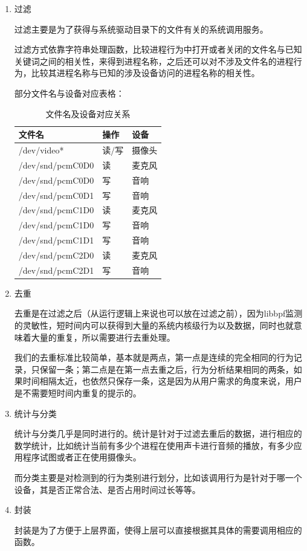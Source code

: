 \documentclass[12pt,a4paper]{ctexart}
\begin{document}
\begin{enumerate}
  \item 过滤

过滤主要是为了获得与系统驱动目录下的文件有关的系统调用服务。


过滤方式依靠字符串处理函数，比较进程行为中打开或者关闭的文件名与已知关键词之间的相关性，来得到进程名称，之后还可以对不涉及文件名的进程行为，比较其进程名称与已知的涉及设备访问的进程名称的相关性。

部分文件名与设备对应表格：


\begin{table}[htb]
\centering
\begin{tabular}{|p{4cm}|p{2cm}|p{3cm}|}
  \hline
  \rowcolor{blue!50} 文件名&操作&设备\\
  \hline
   /dev/video*&读/写&摄像头\\
  \hline
  /dev/snd/pcmC0D0&读&麦克风\\
  \hline
  /dev/snd/pcmC0D0&写&音响\\
  \hline
  /dev/snd/pcmC0D1&写&音响\\
  \hline
  /dev/snd/pcmC1D0&读&麦克风\\
  \hline
  /dev/snd/pcmC1D0&写&音响\\
  \hline
  /dev/snd/pcmC1D1&写&音响\\
  \hline
  /dev/snd/pcmC2D0&读&麦克风\\
  \hline
  /dev/snd/pcmC2D1&写&音响\\
  \hline
\end{tabular}
\caption{文件名及设备对应关系}
\end{table}
  \item 去重


去重是在过滤之后（从运行逻辑上来说也可以放在过滤之前），因为libbpf监测的灵敏性，短时间内可以获得到大量的系统内核级行为以及数据，同时也就意味着大量的重复，所以需要进行去重处理。\par
我们的去重标准比较简单，基本就是两点，第一点是连续的完全相同的行为记录，只保留一条；第二点是在第一点去重之后，行为分析结果相同的两条，如果时间相隔太近，也依然只保存一条，这是因为从用户需求的角度来说，用户是不需要短时间内重复的提示的。

  \item 统计与分类

统计与分类几乎是同时进行的。统计是针对于过滤去重后的数据，进行相应的数学统计，比如统计当前有多少个进程在使用声卡进行音频的播放，有多少应用程序试图或者正在使用摄像头。


而分类主要是对检测到的行为类别进行划分，比如该调用行为是针对于哪一个设备，其是否正常合法、是否占用时间过长等等。

  \item 封装

封装是为了方便于上层界面，使得上层可以直接根据其具体的需要调用相应的函数。

\end{enumerate}
\end{document}
